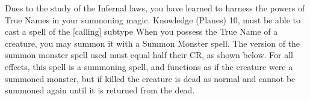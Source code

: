  {}
\shortdescfeat
{Dues to the study of the Infernal laws, you have learned to harness the powers of True Names in your summoning magic.}
{Knowledge (Planes) 10, must be able to cast a spell of the [calling] subtype}
{When you possess the True Name of a creature, you may summon it with a Summon Monster spell. The version of the summon monster spell used must equal half their CR, as shown below. For all effects, this spell is a summoning spell, and functions as if the creature were a summoned monster, but if killed the creature is dead as normal and cannot be summoned again until it is returned from the dead.}